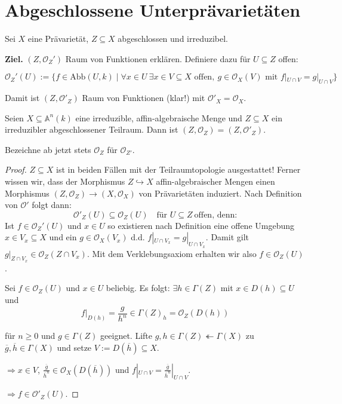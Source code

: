 
\section{Abgeschlossene Unterprävarietäten}
\label{sec:abg-untervarietaeten}

Sei $X$ eine Prävarietät, $Z\subseteq X$ abgeschlossen und irreduzibel.

\textbf{Ziel.} $(Z,\mathcal{O}_{Z}')$ Raum von Funktionen erklären.
Definiere dazu für $U \subseteq Z$ offen:

\[
  \mathcal{O}_{Z}'(U):=\{f\in\text{Abb}(U,k)\mid\forall x\in U\ \exists x\in V\subseteq X\text{ offen},\ g\in\mathcal{O}_{X}(V) \text{ mit } f|_{U\cap V}=g|_{U\cap V}\}
\]

Damit ist $(Z,\mathcal{O}'_{Z})$ Raum von Funktionen (klar!) mit $\mathcal{O}'_{X}=\mathcal{O}_{X}$.
\begin{lem}[orig. 46]
  \label{lem:abg-untervarietaeten-affine-varietaeten}
  Seien $X\subseteq\mathbb{A}^{n}(k)$ eine irreduzible, affin-algebraische Menge
  und $Z\subseteq X$ ein irreduzibler abgeschlossener Teilraum. Dann
  ist $(Z,\mathcal{O}_{Z})=(Z,\mathcal{O}'_{Z})$.

  Bezeichne ab jetzt stets $\mathcal{O}_{Z}$ für $\mathcal{O}_{Z'}$.
\end{lem}
\begin{proof}
  $Z\subseteq X$ ist in beiden Fällen mit der Teilraumtopologie ausgestattet!
  Ferner wissen wir, dass der Morphismus $Z\hookrightarrow X$ affin-algebraischer Mengen einen Morphismus $(Z,\mathcal{O}_{Z})\rightarrow(X,\mathcal{O}_{X})$
  von Prävarietäten induziert. Nach Definition von $\mathcal{O}'$
  folgt dann:
  \[
    \mathcal{O}'_{Z}(U)\subseteq\mathcal{O}_{Z}(U)\quad\text{für }U\subseteq Z\ \text{offen, denn:}
  \] 
  Ist $f \in \mathcal{O}_{Z}'(U)$ und $x \in U$ so existieren nach Definition eine offene Umgebung $x \in V_{x} \subseteq X$ und ein $g \in \mathcal{O}_{X}(V_{x})$ d.d. $f|_{U \cap V_{x}} = g|_{U \cap V_{x}}$. Damit gilt $g|_{Z \cap V_x} \in \mathcal{O}_{Z}(Z \cap V_{x})$. Mit dem Verklebungsaxiom erhalten wir also $f \in \mathcal{O}_{Z}(U)$.


  Sei $f\in\mathcal{O}_{Z}(U)$ und $x\in U$ beliebig. Es folgt: $\exists h\in\Gamma(Z)$
  mit $x\in D(h)\subseteq U$ und
  \[
    f|_{D(h)}=\frac{g}{h^{n}}\in\Gamma(Z)_{h}=\mathcal{O}_{Z}(D(h))
  \]

  für $n\geq0$ und $g\in\Gamma(Z)$ geeignet. Lifte $g,h\in\Gamma(Z)\twoheadleftarrow\Gamma(X)$
  zu $\overline{g},\overline{h}\in\Gamma(X)$ und setze $V:=D(\overline{h})\subseteq X$.

  $\Rightarrow x\in V$, $\frac{\overline{g}}{\overline{h}^{n}}\in\mathcal{O}_{X}(D(\overline{h}))$
  und $f|_{U\cap V}=\frac{\overline{g}}{\overline{h}^{n}}|_{U\cap V}$.

  $\Rightarrow f\in\mathcal{O}'_{Z}(U)$.
\end{proof}
